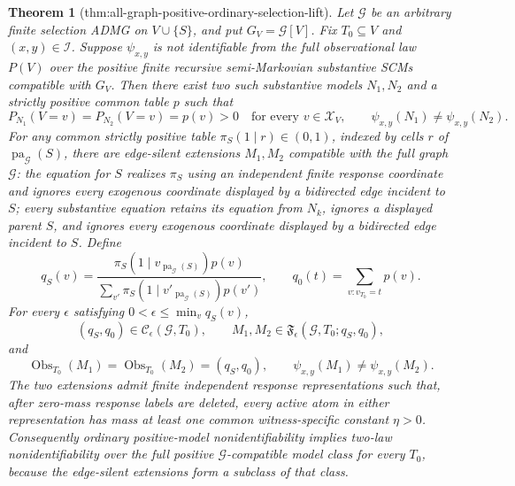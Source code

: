 \documentclass{article}
\newtheorem{theorem}{Theorem}
\begin{document}
\begin{theorem}[thm:all-graph-positive-ordinary-selection-lift]\label{thm:all-graph-positive-ordinary-selection-lift}
Let \(\mathcal G\) be an arbitrary finite selection ADMG on \(V\cup\{S\}\), and put \(G_V=\mathcal G[V]\). Fix \(T_0\subseteq V\) and \((x,y)\in\mathcal I\). Suppose \(\psi_{x,y}\) is not identifiable from the full observational law \(P(V)\) over the positive finite recursive semi-Markovian substantive SCMs compatible with \(G_V\). Then there exist two such substantive models \(N_1,N_2\) and a strictly positive common table \(p\) such that
\[
 P_{N_1}(V=v)=P_{N_2}(V=v)=p(v)>0
 \quad\text{for every }v\in\mathcal X_V,
 \qquad
 \psi_{x,y}(N_1)\ne\psi_{x,y}(N_2).
\]
For any common strictly positive table \(\pi_S(1\mid r)\in(0,1)\), indexed by cells \(r\) of \(\operatorname{pa}_{\mathcal G}(S)\), there are edge-silent extensions \(M_1,M_2\) compatible with the full graph \(\mathcal G\): the equation for \(S\) realizes \(\pi_S\) using an independent finite response coordinate and ignores every exogenous coordinate displayed by a bidirected edge incident to \(S\); every substantive equation retains its equation from \(N_k\), ignores a displayed parent \(S\), and ignores every exogenous coordinate displayed by a bidirected edge incident to \(S\). Define
\[
 q_S(v)=
 \frac{\pi_S(1\mid v_{\operatorname{pa}_{\mathcal G}(S)})p(v)}
 {\sum_{v'}\pi_S(1\mid v'_{\operatorname{pa}_{\mathcal G}(S)})p(v')},
 \qquad
 q_0(t)=\sum_{v:v_{T_0}=t}p(v).
\]
For every \(\epsilon\) satisfying \(0<\epsilon\leq\min_v q_S(v)\),
\[
 (q_S,q_0)\in\mathcal C_{\epsilon}(\mathcal G,T_0),
 \qquad
 M_1,M_2\in\mathfrak F_{\epsilon}(\mathcal G,T_0;q_S,q_0),
\]
and
\[
 \operatorname{Obs}_{T_0}(M_1)=\operatorname{Obs}_{T_0}(M_2)=(q_S,q_0),
 \qquad
 \psi_{x,y}(M_1)\ne\psi_{x,y}(M_2).
\]
The two extensions admit finite independent response representations such that, after zero-mass response labels are deleted, every active atom in either representation has mass at least one common witness-specific constant \(\eta>0\). Consequently ordinary positive-model nonidentifiability implies two-law nonidentifiability over the full positive \(\mathcal G\)-compatible model class for every \(T_0\), because the edge-silent extensions form a subclass of that class.
\end{theorem}
\end{document}
